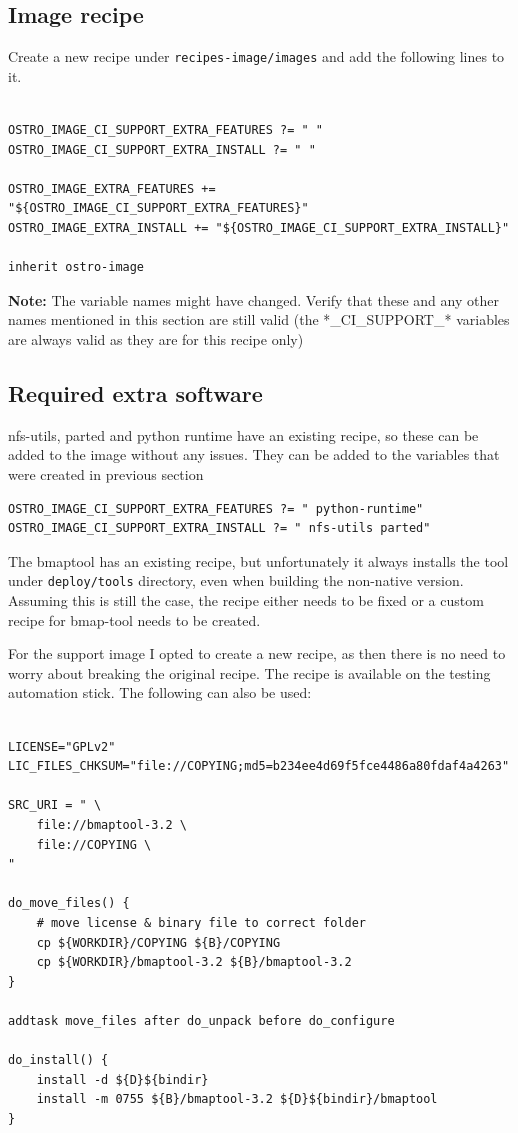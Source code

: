\documentclass[a4paper,11pt]{article}
\newcommand{\note}{\textbf{Note: }}
\newcommand{\cmd}[1]{\texttt{#1}}
\begin{document}
\subsection*{Image recipe}

Create a new recipe under \cmd{recipes-image/images} and add the following lines to it.

\begin{lstlisting}

OSTRO_IMAGE_CI_SUPPORT_EXTRA_FEATURES ?= " "
OSTRO_IMAGE_CI_SUPPORT_EXTRA_INSTALL ?= " "

OSTRO_IMAGE_EXTRA_FEATURES += "${OSTRO_IMAGE_CI_SUPPORT_EXTRA_FEATURES}"
OSTRO_IMAGE_EXTRA_INSTALL += "${OSTRO_IMAGE_CI_SUPPORT_EXTRA_INSTALL}"

inherit ostro-image

\end{lstlisting}

\note The variable names might have changed. Verify that these and any other names mentioned in this section are still valid (the *\_CI\_SUPPORT\_* variables are always valid as they are for this recipe only)

\subsection*{Required extra software}

nfs-utils, parted and python runtime have an existing recipe, so these can be added to the image without any issues. They can be added to the variables that were created in previous section

\begin{lstlisting}
OSTRO_IMAGE_CI_SUPPORT_EXTRA_FEATURES ?= " python-runtime"
OSTRO_IMAGE_CI_SUPPORT_EXTRA_INSTALL ?= " nfs-utils parted"
\end{lstlisting}

The bmaptool has an existing recipe, but unfortunately it always installs the tool under \cmd{deploy/tools} directory, even when building the non-native version. Assuming this is still the case, the recipe either needs to be fixed or a custom recipe for bmap-tool needs to be created. 

For the support image I opted to create a new recipe, as then there is no need to worry about breaking the original recipe. The recipe is available on the testing automation stick. The following can also be used:

\begin{lstlisting}

LICENSE="GPLv2"
LIC_FILES_CHKSUM="file://COPYING;md5=b234ee4d69f5fce4486a80fdaf4a4263"

SRC_URI = " \
    file://bmaptool-3.2 \
    file://COPYING \
"

do_move_files() {
    # move license & binary file to correct folder
    cp ${WORKDIR}/COPYING ${B}/COPYING
    cp ${WORKDIR}/bmaptool-3.2 ${B}/bmaptool-3.2
}

addtask move_files after do_unpack before do_configure

do_install() {
    install -d ${D}${bindir}
    install -m 0755 ${B}/bmaptool-3.2 ${D}${bindir}/bmaptool
}

\end{lstlisting}
\end{document}
